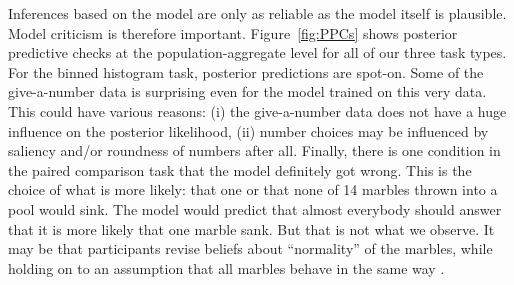 \documentclass[10pt,letterpaper]{article}
\begin{document}
Inferences based on the model are only as reliable as the model itself is plausible. Model
criticism is therefore important. Figure~\ref{fig:PPCs} shows posterior predictive checks at
the population-aggregate level for all of our three task types. For the binned histogram task,
posterior predictions are spot-on. Some of the give-a-number data is surprising even for
the model trained on this very data. This could have various reasons: (i) the give-a-number data does
not have a huge influence on the posterior likelihood, (ii) number choices may be influenced by
saliency and/or roundness of numbers after all. Finally, there is one condition in the paired
comparison task that the model definitely got wrong. This is the choice of what is more likely:
that one or that none of 14 marbles thrown into a pool would sink. The model would predict that
almost everybody should answer that it is more likely that one marble sank. But that is not
what we observe. It may be that participants revise beliefs about ``normality'' of the marbles,
while holding on to an assumption that all marbles behave in the same way 
\cite{DegenTessler2015:Wonky-worlds:-L}.
\end{document}
